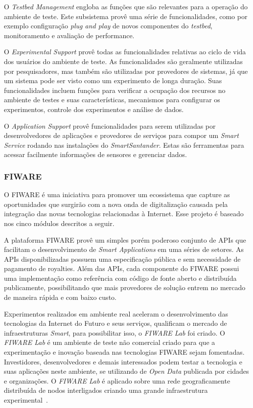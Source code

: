 O \textit{Testbed Management} engloba as funções que são relevantes para a operação do ambiente de teste.
Este subsistema provê uma série de funcionalidades, como por exemplo configuração \textit{plug and play}
de novos componentes do \textit{testbed}, monitoramento e avaliação de performance.


O \textit{Experimental Support} provê todas as funcionalidades relativas ao ciclo de vida dos usuários
do ambiente de teste. As funcionalidades são geralmente utilizadas por pesquisadores, mas também são utilizadas por
provedores de sistemas, já que um sistema pode ser visto como um experimento de longa duração.
Suas funcionalidades incluem funções para verificar a ocupação dos recursos no ambiente de testes e suas características,
mecanismos para configurar os experimentos, controle dos experimentos e análise de dados.

O \textit{Application Support} provê funcionalidades para serem utilizadas por desenvolvedores de aplicações
e provedores de serviços para compor um \textit{Smart Service} rodando nas instalações do \textit{SmartSantander}.
Estas são ferramentas para acessar facilmente informações de sensores e gerenciar dados.

\subsubsection{FIWARE}
O FIWARE é uma iniciativa para promover um ecossistema que capture as oportunidades que surgirão com a nova onda
de digitalização causada pela integração das novas tecnologias relacionadas à Internet. Esse projeto é
baseado nos cinco módulos descritos a seguir.

A plataforma FIWARE provê um simples porém poderoso conjunto de APIs que facilitam o desenvolvimento de \textit{Smart Applications}
em uma séries de setores. As APIs disponibilizadas possuem uma especificação pública e sem necessidade de pagamento de royalties.
Além das APIs, cada componente do FIWARE possui uma implementação como referência com código de fonte aberto e distribuída
publicamente, possibilitando que mais provedores de solução entrem no mercado de maneira rápida e com baixo custo.

Experimentos realizados em ambiente real aceleram o desenvolvimento das tecnologias da Internet do Futuro e seus serviços,
qualificam o mercado de infraestruturas \textit{Smart}, para possibilitar isso, o \textit{FIWARE Lab} foi criado.
O \textit{FIWARE Lab} é um ambiente de teste não comercial criado para que a experimentação e inovação baseada nas tecnologias
FIWARE sejam fomentadas. Investidores, desenvolvedores e demais interessados podem testar a tecnologia e suas aplicações neste
ambiente, se utilizando de \textit{Open Data} publicada por cidades e organizações. O \textit{FIWARE Lab} é aplicado sobre
uma rede geograficamente distribuída de nodos interligados criando uma grande infraestrutura experimental~\cite{7027596}.

